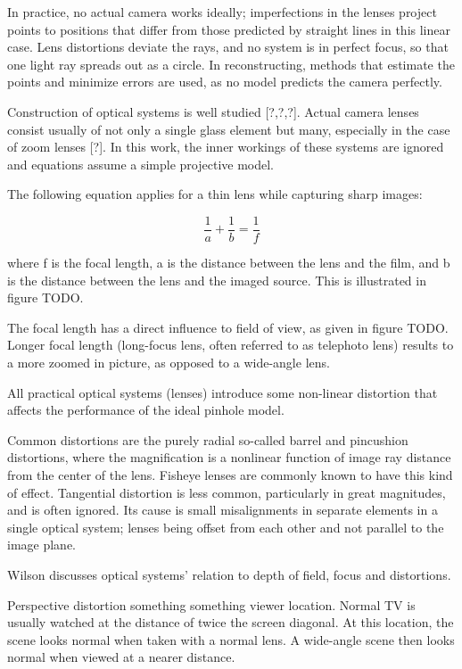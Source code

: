 In practice, no actual camera works ideally; imperfections in the lenses project points to positions that differ from those predicted by straight lines in this linear case. Lens distortions deviate the rays, and no system is in perfect focus, so that one light ray spreads out as a circle. In reconstructing, methods that estimate the points and minimize errors are used, as no model predicts the camera perfectly.

Construction of optical systems is well studied [?,?,?]. Actual camera lenses consist usually of not only a single glass element but many, especially in the case of zoom lenses [?]. In this work, the inner workings of these systems are ignored and equations assume a simple projective model.

The following equation applies for a thin lens while capturing sharp images:

\begin{equation}
	\frac{1}{a} + \frac{1}{b} = \frac{1}{f} \label{eq:focal}
\end{equation}

where f is the focal length, a is the distance between the lens and the film, and b is the distance between the lens and the imaged source. This is illustrated in figure TODO.

The focal length has a direct influence to field of view, as given in figure TODO. Longer focal length (long-focus lens, often referred to as telephoto lens) results to a more zoomed in picture, as opposed to a wide-angle lens. 

All practical optical systems (lenses) introduce some non-linear distortion that affects the performance of the ideal pinhole model.

Common distortions are the purely radial so-called barrel and pincushion distortions, where the magnification is a nonlinear function of image ray distance from the center of the lens.
Fisheye lenses are commonly known to have this kind of effect.
Tangential distortion is less common, particularly in great magnitudes, and is often ignored. Its cause is small misalignments in separate elements in a single optical system; lenses being offset from each other and not parallel to the image plane.

Wilson \cite{wilson2004anton} discusses optical systems' relation to depth of field, focus and distortions.

Perspective distortion something something viewer location. Normal TV is usually watched at the distance of twice the screen diagonal. At this location, the scene looks normal when taken with a normal lens. A wide-angle scene then looks normal when viewed at a nearer distance. \cite{wilson2004anton}


